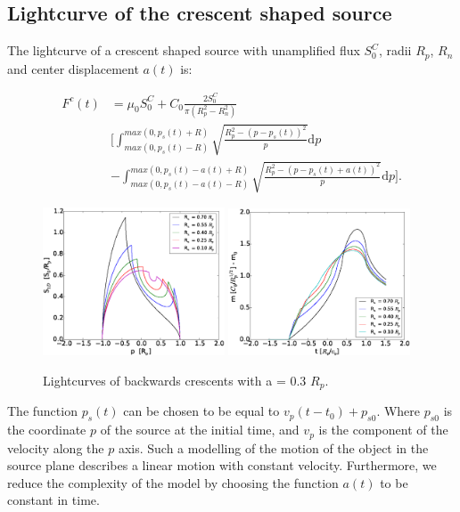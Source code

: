 \documentclass[usenatbib]{mn2e}
\begin{document}
\subsection{Lightcurve of the crescent shaped source}

The lightcurve of a crescent shaped source with unamplified flux $S_0^C$, radii $R_p$, $R_n$ and center displacement $a(t)$ is:


\begin{equation}
\begin{aligned}
 F^c(t) &= \mu_0 S_0^C + C_0 \frac{2 S_0^C}{\pi \left( R_p^2 -R_n^2 \right) } \\
	&\bigg[ \int_{max(0, p_s(t) - R)}^{max(0, p_s(t) + R)} \sqrt{\frac{R_p^2 - \left( p-p_s(t) \right)^2 }{p}} \mathrm{d}p \\
	&  -  \int_{max(0, p_s(t) - a(t) - R)}^{max(0, p_s(t) -a(t) + R)} \sqrt{\frac{R_p^2 - \left( p-p_s(t) +a(t) \right)^2 }{p}} \mathrm{d}p  \bigg] .
\end{aligned}
\end{equation}


\begin{figure}
\centering
	\includegraphics[width = 0.48\textwidth]{figures/S1D_var_rn_a_poz.eps}
	\includegraphics[width = 0.48\textwidth]{figures/5Rn_back_var_magnification.eps}
\caption{\label{fig:lightcurve_crescent_back} Lightcurves of backwards crescents with  a = 0.3 $R_p$.}
\end{figure}

The function $p_s(t)$ can be chosen to be equal to $v_p(t-t_0) + p_{s0}$. Where $p_{s0}$ is the coordinate $p$ of the source at the initial time, and $v_p$ is the component of the velocity
along the $p$ axis. Such a modelling of the motion of the object in the source plane describes a linear motion with constant velocity. Furthermore, we reduce the complexity of the model by 
choosing the function $a(t)$ to be constant in time.  
\end{document}
